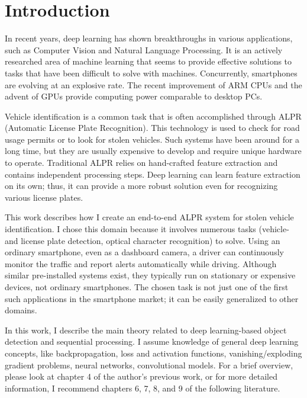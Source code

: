 \chapter{Introduction}

In recent years, deep learning has shown breakthroughs in various applications, such as Computer Vision and Natural Language Processing. It is an actively researched area of machine learning that seems to provide effective solutions to tasks that have been difficult to solve with machines. Concurrently, smartphones are evolving at an explosive rate. The recent improvement of ARM CPUs and the advent of GPUs provide computing power comparable to desktop PCs.

Vehicle identification is a common task that is often accomplished through ALPR (Automatic License Plate Recognition). This technology is used to check for road usage permits or to look for stolen vehicles. Such systems have been around for a long time, but they are usually expensive to develop and require unique hardware to operate. Traditional ALPR relies on hand-crafted feature extraction and contains independent processing steps. Deep learning can learn feature extraction on its own; thus, it can provide a more robust solution even for recognizing various license plates.

This work describes how I create an end-to-end ALPR system for stolen vehicle identification. I chose this domain because it involves numerous tasks (vehicle- and license plate detection, optical character recognition) to solve. Using an ordinary smartphone, even as a dashboard camera, a driver can continuously monitor the traffic and report alerts automatically while driving. Although similar pre-installed systems exist, they typically run on stationary or expensive devices, not ordinary smartphones. The chosen task is not just one of the first such applications in the smartphone market; it can be easily generalized to other domains.

In this work, I describe the main theory related to deep learning-based object detection and sequential processing. I assume knowledge of general deep learning concepts, like backpropagation, loss and activation functions, vanishing/exploding gradient problems, neural networks, convolutional models. For a brief overview, please look at chapter 4 of the author's previous work\cite{BScThesis}, or for more detailed information, I recommend chapters 6, 7, 8, and 9 of the following literature\cite{DeepLearningBook}.


